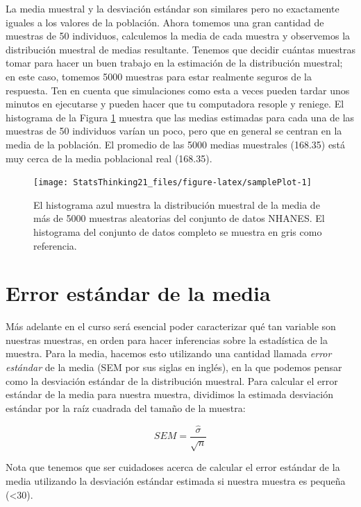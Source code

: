 \documentclass[
  12pt,
]{book}
\theoremstyle{definition}
\theoremstyle{definition}
\theoremstyle{definition}
\theoremstyle{remark}
\begin{document}
La media muestral y la desviación estándar son similares pero no exactamente iguales a los valores de la población. Ahora tomemos una gran cantidad de muestras de 50 individuos, calculemos la media de cada muestra y observemos la distribución muestral de medias resultante. Tenemos que decidir cuántas muestras tomar para hacer un buen trabajo en la estimación de la distribución muestral; en este caso, tomemos 5000 muestras para estar realmente seguros de la respuesta. Ten en cuenta que simulaciones como esta a veces pueden tardar unos minutos en ejecutarse y pueden hacer que tu computadora resople y reniege. El histograma de la Figura \ref{fig:samplePlot} muestra que las medias estimadas para cada una de las muestras de 50 individuos varían un poco, pero que en general se centran en la media de la población. El promedio de las 5000 medias muestrales (168.35) está muy cerca de la media poblacional real (168.35).

\begin{figure}
\texttt{[image: StatsThinking21\_files/figure-latex/samplePlot-1]} \caption{El histograma azul muestra la distribución muestral de la media de más de 5000 muestras aleatorias del conjunto de datos NHANES. El histograma del conjunto de datos completo se muestra en gris como referencia.}\label{fig:samplePlot}
\end{figure}

\hypertarget{standard-error-of-the-mean}{%
\section{Error estándar de la media}\label{standard-error-of-the-mean}}

Más adelante en el curso será esencial poder caracterizar qué tan variable son nuestras muestras, en orden para hacer inferencias sobre la estadística de la muestra. Para la media, hacemos esto utilizando una cantidad llamada \emph{error estándar} de la media (SEM por sus siglas en inglés), en la que podemos pensar como la desviación estándar de la distribución muestral. Para calcular el error estándar de la media para nuestra muestra, dividimos la estimada desviación estándar por la raíz cuadrada del tamaño de la muestra:

\[
SEM = \frac{\hat{\sigma}}{\sqrt{n}}
\]

Nota que tenemos que ser cuidadoses acerca de calcular el error estándar de la media utilizando la desviación estándar estimada si nuestra muestra es pequeña (\textless30).
\end{document}
